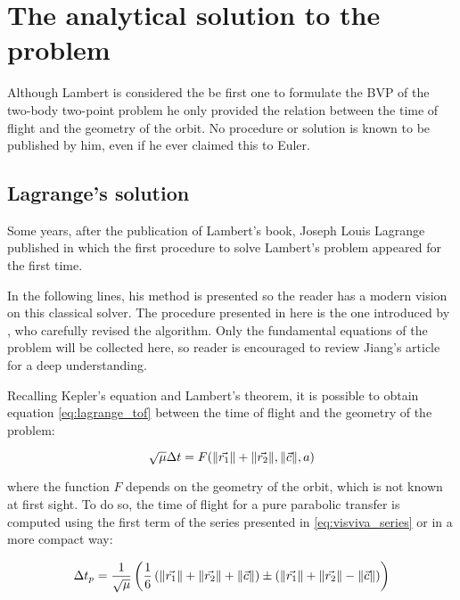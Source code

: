 \section{The analytical solution to the problem}

Although Lambert is considered the be first one to formulate the BVP of the
two-body two-point problem he only provided the relation between the time of
flight and the geometry of the orbit. No procedure or solution is known to be
published by him, even if he ever claimed this to Euler.


\subsection{Lagrange's solution}
\label{sec:lagrange_sol}

Some years, after the publication of Lambert's book, Joseph Louis Lagrange
published  in which the first procedure to solve
Lambert's problem appeared for the first time.

In the following lines, his method is presented so the reader has a modern
vision on this classical solver. The procedure presented in here is the one
introduced by \cite{jiang2016}, who carefully revised the algorithm. Only the
fundamental equations of the problem will be collected here, so reader is
encouraged to review Jiang's article for a deep understanding.

Recalling Kepler's equation and Lambert's theorem, it is possible to obtain
equation \ref{eq:lagrange_tof} between the time of flight and the geometry of
the problem:

\begin{equation}
  \sqrt{\mu} \Delta t = F(\lVert\vec{r_1}\rVert + \lVert\vec{r_2}\rVert, \lVert\vec{c}\rVert, a)
  \label{eq:lagrange_tof}
\end{equation}

where the function $F$ depends on the geometry of the orbit, which is not known
at first sight. To do so, the time of flight for a pure parabolic transfer is
computed using the first term of the series presented in \ref{eq:visviva_series}
or in a more compact way:

\begin{equation}
	\Delta t_p = \frac{1}{\sqrt{\mu}} \left(
	\frac{1}{6}\left(\lVert\vec{r_1}\rVert + \lVert\vec{r_2}\rVert + \lVert\vec{c}\rVert
\right)  \pm \left(\lVert\vec{r_1}\rVert + \lVert\vec{r_2}\rVert - \lVert\vec{c}\rVert \right) \right)
\end{equation}

